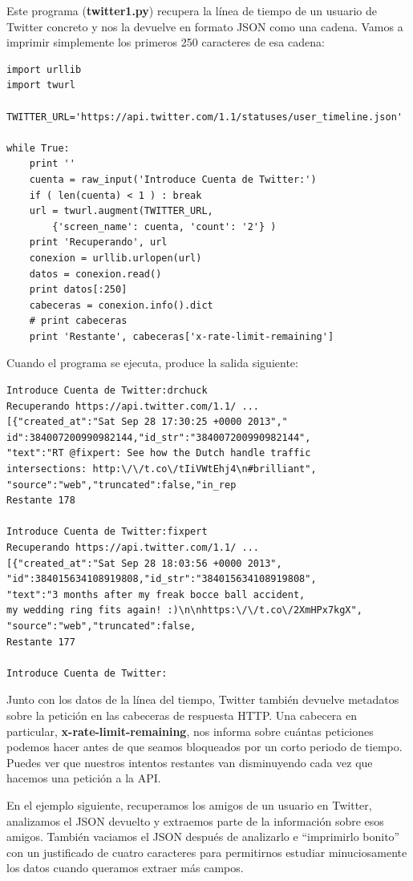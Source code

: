 Este programa ({\bf twitter1.py}) recupera la línea de tiempo
de un usuario de Twitter concreto y nos la devuelve en formato
JSON como una cadena. Vamos a imprimir simplemente los primeros 250
caracteres de esa cadena:

\beforeverb
\begin{verbatim}
import urllib
import twurl

TWITTER_URL='https://api.twitter.com/1.1/statuses/user_timeline.json'

while True:
    print ''
    cuenta = raw_input('Introduce Cuenta de Twitter:')
    if ( len(cuenta) < 1 ) : break
    url = twurl.augment(TWITTER_URL,
        {'screen_name': cuenta, 'count': '2'} )
    print 'Recuperando', url
    conexion = urllib.urlopen(url)
    datos = conexion.read()
    print datos[:250]
    cabeceras = conexion.info().dict
    # print cabeceras
    print 'Restante', cabeceras['x-rate-limit-remaining']
\end{verbatim}
\afterverb
%
Cuando el programa se ejecuta, produce la salida siguiente: 
 
\beforeverb
\begin{verbatim}
Introduce Cuenta de Twitter:drchuck
Recuperando https://api.twitter.com/1.1/ ...
[{"created_at":"Sat Sep 28 17:30:25 +0000 2013","
id":384007200990982144,"id_str":"384007200990982144",
"text":"RT @fixpert: See how the Dutch handle traffic 
intersections: http:\/\/t.co\/tIiVWtEhj4\n#brilliant",
"source":"web","truncated":false,"in_rep
Restante 178

Introduce Cuenta de Twitter:fixpert
Recuperando https://api.twitter.com/1.1/ ...
[{"created_at":"Sat Sep 28 18:03:56 +0000 2013",
"id":384015634108919808,"id_str":"384015634108919808",
"text":"3 months after my freak bocce ball accident, 
my wedding ring fits again! :)\n\nhttps:\/\/t.co\/2XmHPx7kgX",
"source":"web","truncated":false,
Restante 177

Introduce Cuenta de Twitter:
\end{verbatim}
\afterverb
%
Junto con los datos de la línea del tiempo, Twitter también devuelve
metadatos sobre la petición en las cabeceras de respuesta HTTP.
Una cabecera en particular, {\bf x-rate-limit-remaining}, nos informa
sobre cuántas peticiones podemos hacer antes de que seamos bloqueados
por un corto periodo de tiempo. Puedes ver que nuestros intentos
restantes van disminuyendo cada vez que hacemos una petición a la
API.

En el ejemplo siguiente, recuperamos los amigos de un usuario en Twitter,
analizamos el JSON devuelto y extraemos parte de la información
sobre esos amigos. También vaciamos el JSON después de analizarlo e
``imprimirlo bonito'' con un justificado de cuatro caracteres para permitirnos
estudiar minuciosamente los datos cuando queramos extraer más campos.

